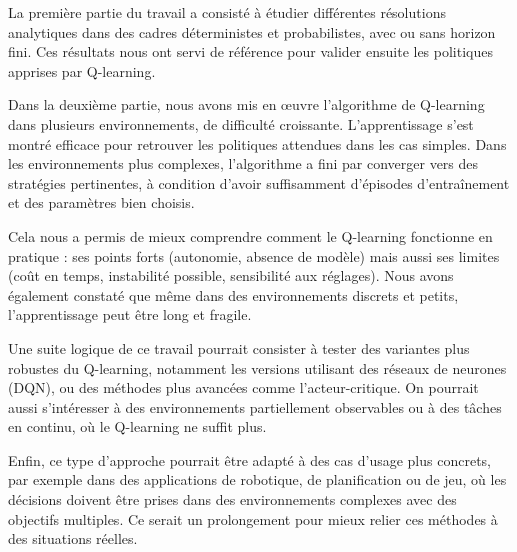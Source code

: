 \documentclass[12pt]{article}
\begin{document}
La première partie du travail a consisté à étudier différentes résolutions analytiques dans des cadres déterministes et probabilistes, avec ou sans horizon fini. Ces résultats nous ont servi de référence pour valider ensuite les politiques apprises par Q-learning.

Dans la deuxième partie, nous avons mis en œuvre l’algorithme de Q-learning dans plusieurs environnements, de difficulté croissante. L’apprentissage s’est montré efficace pour retrouver les politiques attendues dans les cas simples. Dans les environnements plus complexes, l’algorithme a fini par converger vers des stratégies pertinentes, à condition d’avoir suffisamment d’épisodes d’entraînement et des paramètres bien choisis.

Cela nous a permis de mieux comprendre comment le Q-learning fonctionne en pratique : ses points forts (autonomie, absence de modèle) mais aussi ses limites (coût en temps, instabilité possible, sensibilité aux réglages). Nous avons également constaté que même dans des environnements discrets et  petits, l’apprentissage peut être long et fragile.

Une suite logique de ce travail pourrait consister à tester des variantes plus robustes du Q-learning, notamment les versions utilisant des réseaux de neurones (DQN), ou des méthodes plus avancées comme l’acteur-critique. On pourrait aussi s’intéresser à des environnements partiellement observables ou à des tâches en continu, où le Q-learning  ne suffit plus.

Enfin, ce type d’approche pourrait être adapté à des cas d’usage plus concrets, par exemple dans des applications de robotique, de planification ou de jeu, où les décisions doivent être prises dans des environnements complexes avec des objectifs multiples. Ce serait un prolongement pour mieux relier ces méthodes à des situations réelles.
\end{document}
